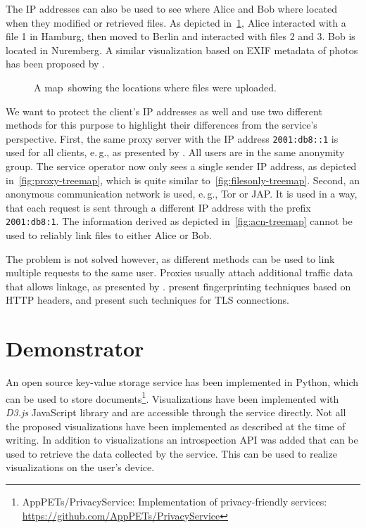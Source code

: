 The IP addresses can also be used to see where Alice and Bob where located when they modified or retrieved files.
As depicted in~\cref{fig:geolocation}, Alice interacted with a file 1 in Hamburg, then moved to Berlin and interacted with files 2 and 3.
Bob is located in Nuremberg.
A similar visualization based on EXIF metadata of photos has been proposed by \textcite{Krause:2017}.

\begin{figure}[h]
	\centering
	
	\caption[A map showing the locations where files were uploaded.]{A map\footnotemark\ showing the locations where files were uploaded.}%
	\label{fig:geolocation}
\end{figure}

We want to protect the client's IP addresses as well and use two different methods for this purpose to highlight their differences from the service's perspective.
First, the same proxy server with the IP address \texttt{2001:db8::1} is used for all clients, e.\,g., as presented by \textcite{DBLP:conf/icccn/PanchenkoWPA09}.
All users are in the same anonymity group.
The service operator now only sees a single sender IP address, as depicted in~\cref{fig:proxy-treemap}, which is quite similar to~\cref{fig:filesonly-treemap}.
Second, an anonymous communication network is used, e.\,g., Tor or JAP.
It is used in a way, that each request is sent through a different IP address with the prefix \texttt{2001:db8:1}.
The information derived as depicted in~\cref{fig:acn-treemap} cannot be used to reliably link files to either Alice or Bob.

The problem is not solved however, as different methods can be used to link multiple requests to the same user.
Proxies usually attach additional traffic data that allows linkage, as presented by \textcite{DBLP:journals/corr/PerinoSV16}.
\textcite{DBLP:conf/pet/Eckersley10} present fingerprinting techniques based on HTTP headers, and \textcite{DBLP:journals/ejisec/HusakCJC16} present such techniques for TLS connections.

\section{Demonstrator}
An open source key-value storage service has been implemented in Python, which can be used to store documents\footnote{AppPETs/PrivacyService: Implementation of privacy-friendly services: \url{https://github.com/AppPETs/PrivacyService}}.
Visualizations have been implemented with \textit{D3.js} JavaScript library and are accessible through the service directly.
Not all the proposed visualizations have been implemented as described at the time of writing.
In addition to visualizations an introspection API was added that can be used to retrieve the data collected by the service.
This can be used to realize visualizations on the user's device.

